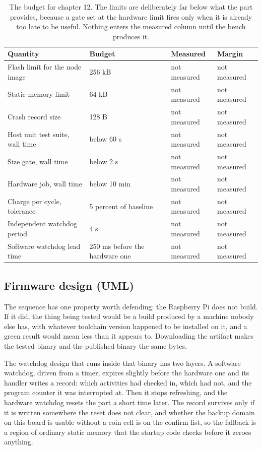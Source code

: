 \begin{table}[H]\centering\small
\begin{tabular}{p{44mm}p{28mm}p{28mm}p{30mm}}
\toprule
Quantity & Budget & Measured & Margin \\
\midrule
Flash limit for the node image & 256 kB & not measured & not measured \\
Static memory limit & 64 kB & not measured & not measured \\
Crash record size & 128 B & not measured & not measured \\
Host unit test suite, wall time & below 60 s & not measured & not measured \\
Size gate, wall time & below 2 s & not measured & not measured \\
Hardware job, wall time & below 10 min & not measured & not measured \\
Charge per cycle, tolerance & 5 percent of baseline & not measured & not measured \\
Independent watchdog period & 4 s & not measured & not measured \\
Software watchdog lead time & 250 ms before the hardware one & not measured & not measured \\
\bottomrule
\end{tabular}
\caption{The budget for chapter 12. The limits are deliberately far below what the part provides, because a gate set at the hardware limit fires only when it is already too late to be useful. Nothing enters the measured column until the bench produces it.}
\end{table}

\subsection*{Firmware design (UML)}


The sequence has one property worth defending: the Raspberry Pi does not build.
If it did, the thing being tested would be a build produced by a machine nobody
else has, with whatever toolchain version happened to be installed on it, and a
green result would mean less than it appears to. Downloading the artifact makes
the tested binary and the published binary the same bytes.

The watchdog design that runs inside that binary has two layers. A software
watchdog, driven from a timer, expires slightly before the hardware one and its
handler writes a record: which activities had checked in, which had not, and the
program counter it was interrupted at. Then it stops refreshing, and the
hardware watchdog resets the part a short time later. The record survives only
if it is written somewhere the reset does not clear, and whether the backup
domain on this board is usable without a coin cell is on the confirm list, so
the fallback is a region of ordinary static memory that the startup code checks
before it zeroes anything.

